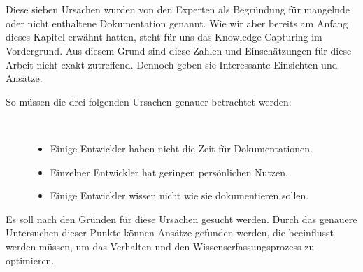 \documentclass[a4paper,12pt]{scrartcl}
\begin{document}
\\\\
Diese sieben Ursachen wurden von den Experten als Begründung für mangelnde oder nicht enthaltene Dokumentation genannt. Wie wir aber bereits am Anfang dieses Kapitel erwähnt hatten, steht für uns das Knowledge Capturing im Vordergrund. Aus diesem Grund sind diese Zahlen und Einschätzungen für diese Arbeit nicht exakt zutreffend. Dennoch geben sie Interessante Einsichten und Ansätze.    
\begin{description}
   \item[So müssen die drei folgenden Ursachen genauer betrachtet werden:]~\par
   \begin{itemize}
      \item Einige Entwickler haben nicht die Zeit für Dokumentationen.
      \item Einzelner Entwickler hat geringen persönlichen Nutzen.
      \item Einige Entwickler wissen nicht wie sie dokumentieren sollen.
   \end{itemize}
\end{description}
Es soll nach den Gründen für diese Ursachen gesucht werden. Durch das genauere Untersuchen dieser Punkte können Ansätze gefunden werden, die beeinflusst werden müssen, um das Verhalten und den Wissenserfassungsprozess zu optimieren. 
\end{document}

